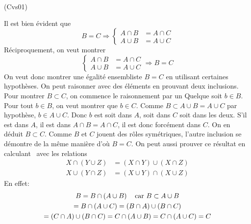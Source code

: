 \begin{tiny}(Cvs01)\end{tiny}
Il est bien évident que
\begin{displaymath}
  B = C \Rightarrow 
  \left\lbrace 
  \begin{aligned}
    A \cap B &= A \cap C \\ A\cup B &= A\cup C
  \end{aligned}
\right. 
\end{displaymath}
Réciproquement, on veut montrer
\begin{displaymath}
  \left\lbrace 
  \begin{aligned}
    A \cap B &= A \cap C \\ A\cup B &= A\cup C
  \end{aligned}
\right. 
 \Rightarrow  B = C
\end{displaymath}
On veut donc montrer une égalité ensembliste $B=C$ en utilisant certaines hypothèses.\newline
On peut raisonner avec des éléments en prouvant deux inclusions.\newline
Pour montrer $B\subset C$, on commence le raisonnement par un \og Quelque soit $b\in B$\fg.\newline
Pour tout $b\in B$, on veut montrer que $b\in C$.
Comme $B\subset A\cup B = A\cup C$ par hypothèse, $b\in A\cup C$. Donc $b$ est soit dans $A$, soit dans $C$ soit dans les deux. S'il est dans $A$, il est dans $A\cap B = A\cap C$, il est donc forcément dans $C$. On en déduit $B\subset C$.\newline
Comme $B$ et $C$ jouent des rôles symétriques, l'autre inclusion se démontre de la même manière d'où $B=C$.
On peut aussi prouver ce résultat en \og calculant\fg~ avec les relations
\begin{align*}
  X\cap(Y\cup Z) &= (X\cap Y) \cup (X\cap Z)\\  X\cup(Y\cap Z) &= (X\cup Y) \cap (X\cup Z)
\end{align*}
En effet:
\begin{multline*}
B = B\cap(A\cup B)\hspace{0.3cm}\text{ car }B\subset A\cup B\\
 = B\cap(A\cup C) = (B\cap A) \cup (B\cap C) \\
 = (C\cap A) \cup (B\cap C) = C\cap(A\cup B) = C\cap(A\cup C) = C
\end{multline*}

